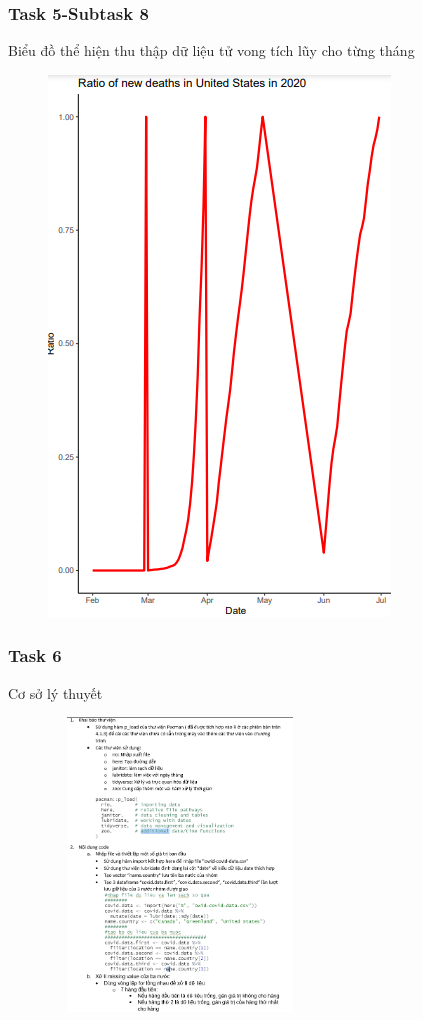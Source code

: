 \documentclass[english,10pt,table]{beamer}
\begin{document}
{
    \frametitle{Task 5-Subtask 8}
    \begin{block}{Biểu đồ thể hiện thu thập dữ liệu tử vong tích lũy cho từng tháng}
    \begin{figure}[H]
		\centering
		\includegraphics[scale=0.5]{images/5.8.3.png}
	\end{figure}
    \end{block}
}
\frame
{
    \frametitle{Task 6}
    \begin{block}{Cơ sở lý thuyết}
    \begin{figure}[H]
		\centering
		\includegraphics[height=7.8cm,width=7cm]{images/6.0.png}
	\end{figure}
    \end{block}
}
\end{document}
